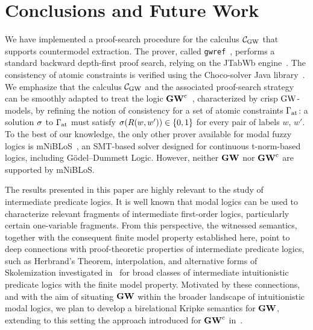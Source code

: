 \section{Conclusions and Future Work}


We have implemented a proof-search procedure for the calculus $\mathcal{C}_{\mathrm{GW}}$
that supports countermodel extraction.  The prover, called
\texttt{gwref}~\cite{gwrefProver}, performs a standard backward
depth-first proof search, relying on the JTabWb
engine~\cite{FerrariFF:17a}. The consistency of atomic constraints is
verified using the Choco-solver Java library~\cite{ChocoSolver:2025}.
We emphasize that the calculus $\mathcal{C}_{\mathrm{GW}}$ and the associated
proof-search strategy can be smoothly adapted to treat the logic
$\mathbf{GW}^\mathrm{c}$~\cite{FerFioRod:2025}, characterized by crisp $\mbox{$\mathrm{GW}$}$-models,
by refining the notion of consistency for a set of atomic constraints
$\Gamma_\mathrm{at}$: a solution $\sigma$ to $\Gamma_\mathrm{at}$ must satisfy $\sigma(R(w,w')) \in
\{0,1\}$ for every pair of labels $w$, $w'$.  To the best of our
knowledge, the only other prover available for modal fuzzy logics is
mNiBLoS~\cite{Vidal:16}, an SMT-based solver designed for continuous
t-norm-based logics, including G\"odel--Dummett Logic.  However,
neither $\mathbf{GW}$ nor $\mathbf{GW}^\mathrm{c}$ are supported by mNiBLoS.



The results presented in this paper are highly relevant to the study
of intermediate predicate logics. It is well known that modal logics
can be used to characterize relevant fragments of intermediate
first-order logics, particularly certain one-variable fragments. From
this perspective, the witnessed semantics, together with the consequent
finite model property established here, point to deep connections with
proof-theoretic properties of intermediate predicate logics, such as
Herbrand’s Theorem, interpolation, and alternative forms of
Skolemization investigated in~\cite{BI-IGPL2016} for broad classes of
intermediate intuitionistic predicate logics with the finite model
property.  Motivated by these connections, and with the aim of
situating $\mathbf{GW}$ within the broader landscape of intuitionistic modal
logics, we plan to develop a birelational Kripke semantics for $\mathbf{GW}$,
extending to this setting the approach introduced for $\mathbf{GW}^\mathrm{c}$
in~\cite{FerFioRod:2025}.

